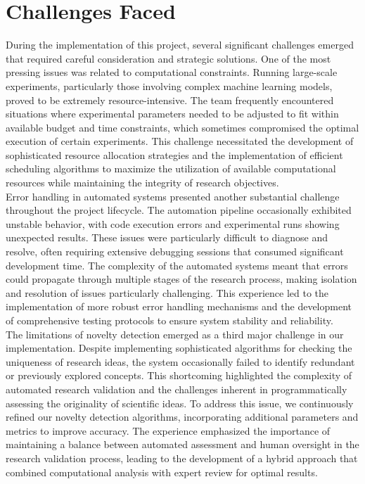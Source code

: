 \section{Challenges Faced}
During the implementation of this project, several significant challenges emerged that required careful consideration and strategic solutions. One of the most pressing issues was related to computational constraints. Running large-scale experiments, particularly those involving complex machine learning models, proved to be extremely resource-intensive. The team frequently encountered situations where experimental parameters needed to be adjusted to fit within available budget and time constraints, which sometimes compromised the optimal execution of certain experiments. This challenge necessitated the development of sophisticated resource allocation strategies and the implementation of efficient scheduling algorithms to maximize the utilization of available computational resources while maintaining the integrity of research objectives. \\Error handling in automated systems presented another substantial challenge throughout the project lifecycle. The automation pipeline occasionally exhibited unstable behavior, with code execution errors and experimental runs showing unexpected results. These issues were particularly difficult to diagnose and resolve, often requiring extensive debugging sessions that consumed significant development time. The complexity of the automated systems meant that errors could propagate through multiple stages of the research process, making isolation and resolution of issues particularly challenging. This experience led to the implementation of more robust error handling mechanisms and the development of comprehensive testing protocols to ensure system stability and reliability.\\The limitations of novelty detection emerged as a third major challenge in our implementation. Despite implementing sophisticated algorithms for checking the uniqueness of research ideas, the system occasionally failed to identify redundant or previously explored concepts. This shortcoming highlighted the complexity of automated research validation and the challenges inherent in programmatically assessing the originality of scientific ideas. To address this issue, we continuously refined our novelty detection algorithms, incorporating additional parameters and metrics to improve accuracy. The experience emphasized the importance of maintaining a balance between automated assessment and human oversight in the research validation process, leading to the development of a hybrid approach that combined computational analysis with expert review for optimal results.

